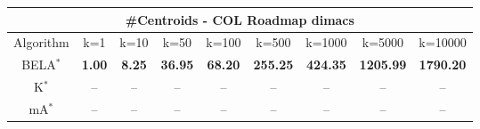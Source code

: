 \begin{tabular}{c|cccccccc}\toprule
\multicolumn{9}{c}{#Centroids - COL Roadmap dimacs}\\ \midrule
Algorithm & k=1 & k=10 & k=50 & k=100 & k=500 & k=1000 & k=5000 & k=10000 \\ \midrule
BELA$^*$ & \textbf{1.00} & \textbf{8.25} & \textbf{36.95} & \textbf{68.20} & \textbf{255.25} & \textbf{424.35} & \textbf{1205.99} & \textbf{1790.20} \\
K$^*$ & -- & -- & -- & -- & -- & -- & -- & -- \\
mA$^*$ & -- & -- & -- & -- & -- & -- & -- & -- \\ \bottomrule 
\end{tabular}
